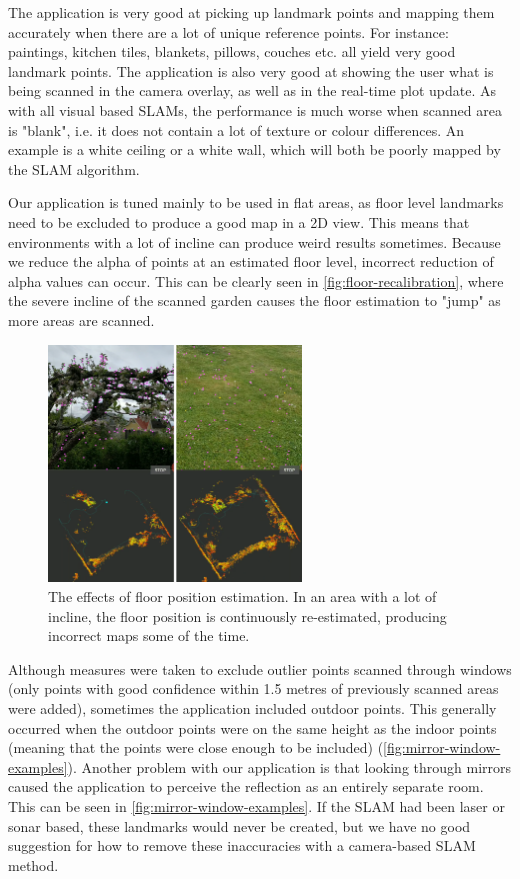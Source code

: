 \documentclass{article}
\begin{document}
The application is very good at picking up landmark points and mapping them accurately when there are a lot of unique reference points. For instance: paintings, kitchen tiles, blankets, pillows, couches etc. all yield very good landmark points. The application is also very good at showing the user what is being scanned in the camera overlay, as well as in the real-time plot update. As with all visual based SLAMs, the performance is much worse when scanned area is "blank", i.e. it does not contain a lot of texture or colour differences. An example is a white ceiling or a white wall, which will both be poorly mapped by the SLAM algorithm.

Our application is tuned mainly to be used in flat areas, as floor level landmarks need to be excluded to produce a good map in a 2D view. This means that environments with a lot of incline can produce weird results sometimes. Because we reduce the alpha of points at an estimated floor level, incorrect reduction of alpha values can occur. This can be clearly seen in \autoref{fig:floor-recalibration}, where the severe incline of the scanned garden causes the floor estimation to "jump" as more areas are scanned. 

\begin{figure}[!htb]
    \centering
    \includegraphics[width=0.6\textwidth]{floor-recalibration.png}
    \caption{The effects of floor position estimation. In an area with a lot of incline, the floor position is continuously re-estimated, producing incorrect maps some of the time.}
    \label{fig:floor-recalibration}
\end{figure}

Although measures were taken to exclude outlier points scanned through windows (only points with good confidence within 1.5 metres of previously scanned areas were added), sometimes the application included outdoor points. This generally occurred when the outdoor points were on the same height as the indoor points (meaning that the points were close enough to be included) (\autoref{fig:mirror-window-examples}). Another problem with our application is that looking through mirrors caused the application to perceive the reflection as an entirely separate room. This can be seen in \autoref{fig:mirror-window-examples}. If the SLAM had been laser or sonar based, these landmarks would never be created, but we have no good suggestion for how to remove these inaccuracies with a camera-based SLAM method.
\end{document}
